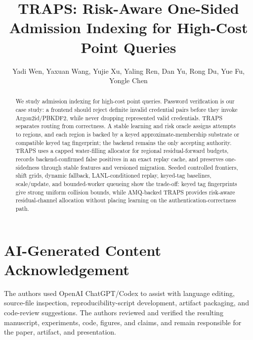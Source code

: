 \documentclass[conference]{IEEEtran}
\begin{document}
\title{TRAPS: Risk-Aware One-Sided Admission Indexing for High-Cost Point Queries}
\author{
  Yadi Wen, Yaxuan Wang, Yujie Xu, Yaling Ren, Dan Yu, Rong Du, Yue Fu, Yongle Chen\\
}
\maketitle

\begin{abstract}
We study admission indexing for high-cost point queries. Password verification is our case study: a frontend should reject definite invalid credential pairs before they invoke Argon2id/PBKDF2, while never dropping represented valid credentials. TRAPS separates routing from correctness. A stable learning and risk oracle assigns attempts to regions, and each region is backed by a keyed approximate-membership substrate or compatible keyed tag fingerprint; the backend remains the only accepting authority. TRAPS uses a capped water-filling allocator for regional residual-forward budgets, records backend-confirmed false positives in an exact replay cache, and preserves one-sidedness through stable features and versioned migration. Seeded controlled frontiers, shift grids, dynamic fallback, LANL-conditioned replay, keyed-tag baselines, scale/update, and bounded-worker queueing show the trade-off: keyed tag fingerprints give strong uniform collision bounds, while AMQ-backed TRAPS provides risk-aware residual-channel allocation without placing learning on the authentication-correctness path.

\end{abstract}









\section*{AI-Generated Content Acknowledgement}
The authors used OpenAI ChatGPT/Codex to assist with language editing, source-file inspection, reproducibility-script development, artifact packaging, and code-review suggestions. The authors reviewed and verified the resulting manuscript, experiments, code, figures, and claims, and remain responsible for the paper, artifact, and presentation.


\end{document}
